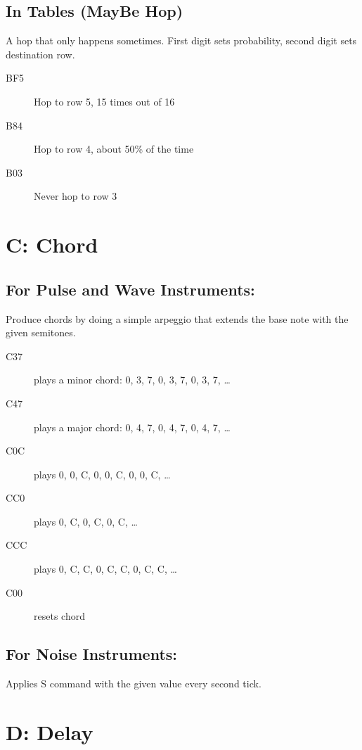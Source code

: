 \subsection{In Tables (MayBe Hop)}

A hop that only happens sometimes.
First digit sets probability, second digit
sets destination row.

\begin{description}
    \item[BF5] Hop to row 5, 15 times out of 16
    \item[B84] Hop to row 4, about 50\% of the time
    \item[B03] Never hop to row 3
\end{description}

\section{C: Chord}

\subsection{For Pulse and Wave Instruments:}

\label{command-chord}
Produce chords by doing a simple arpeggio that extends the base note with the given semitones.

\begin{description}
\item[C37] plays a minor chord: 0, 3, 7, 0, 3, 7, 0, 3, 7, \ldots
\item[C47] plays a major chord: 0, 4, 7, 0, 4, 7, 0, 4, 7, \ldots
\item[C0C] plays 0, 0, C, 0, 0, C, 0, 0, C, \ldots
\item[CC0] plays 0, C, 0, C, 0, C, \ldots
\item[CCC] plays 0, C, C, 0, C, C, 0, C, C, \ldots
\item[C00] resets chord
\end{description}

\subsection{For Noise Instruments:}

Applies S command with the given value every second tick.

\section{D: Delay}

